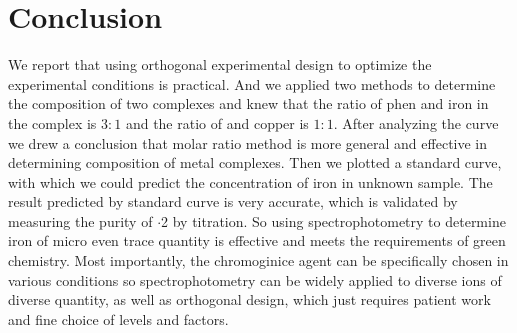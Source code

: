 \section{Conclusion}
 We report that using orthogonal experimental design to optimize the experimental conditions is practical. And we applied two methods to determine the composition of two complexes and knew that the ratio of phen and iron in the complex is $3:1$ and the ratio of  and copper is $1:1$. After analyzing the curve we drew a conclusion that molar ratio method is more general and effective in determining composition of metal complexes. Then we plotted a standard curve, with which we could predict the concentration of iron in unknown sample. The result predicted by standard curve is very accurate, which is validated by measuring the purity of $\cdot$2 by titration. So using spectrophotometry to determine iron of micro even trace quantity is effective and meets the requirements of green chemistry. Most importantly, the chromoginice agent can be specifically chosen in various conditions so spectrophotometry can be widely applied to diverse ions of diverse quantity, as well as orthogonal design, which just requires patient work and fine choice of levels and factors.